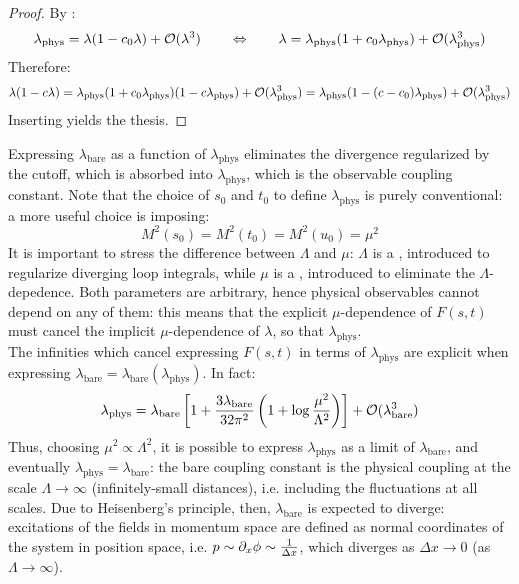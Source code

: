 \begin{proofbox}
  \begin{proof}
    By :
    \begin{equation*}
      \lambda_\text{phys} = \lambda (1 - c_0 \lambda) + \mathcal{O}(\lambda^3)
      \qquad \Leftrightarrow \qquad
      \lambda = \lambda_\text{phys} (1 + c_0 \lambda_\text{phys}) + \mathcal{O}(\lambda_\text{phys}^3)
    \end{equation*}
    Therefore:
    \begin{equation*}
      \lambda (1 - c \lambda) = \lambda_\text{phys} (1 + c_0 \lambda_\text{phys}) (1 - c \lambda_\text{phys}) + \mathcal{O}(\lambda_\text{phys}^3) = \lambda_\text{phys} (1 - (c - c_0) \lambda_\text{phys}) + \mathcal{O}(\lambda_\text{phys}^3)
    \end{equation*}
    Inserting  yields the thesis.
  \end{proof}
\end{proofbox}

Expressing $ \lambda_\text{bare} $ as a function of $ \lambda_\text{phys} $ eliminates the divergence regularized by the cutoff, which is absorbed into $ \lambda_\text{phys} $, which is the observable coupling constant. Note that the choice of $ s_0 $ and $ t_0 $ to define $ \lambda_\text{phys} $ is purely conventional: a more useful choice is imposing:
\begin{equation}
  M^2(s_0) = M^2(t_0) = M^2(u_0) = \mu^2
\end{equation}
It is important to stress the difference between $ \Lambda $ and $ \mu $: $ \Lambda $ is a , introduced to regularize diverging loop integrals, while $ \mu $ is a , introduced to eliminate the $ \Lambda $-depedence\footnotemark. Both parameters are arbitrary, hence physical observables cannot depend on any of them: this means that the explicit $ \mu $-dependence of $ F(s,t) $ must cancel the implicit $ \mu $-dependence of $ \lambda $, so that $ \lambda_\text{phys} $. \\
The infinities which cancel expressing $ F(s,t) $ in terms of $ \lambda_\text{phys} $ are explicit when expressing $ \lambda_\text{bare} = \lambda_\text{bare}(\lambda_\text{phys}) $. In fact:
\begin{equation*}
  \lambda_\text{phys} = \lambda_\text{bare} \left[ 1 + \frac{3\lambda_\text{bare}}{32\pi^2} \left( 1 + \log \frac{\mu^2}{\Lambda^2} \right) \right] + \mathcal{O}(\lambda_\text{bare}^3)
\end{equation*}
Thus, choosing $ \mu^2 \propto \Lambda^2 $, it is possible to express $ \lambda_\text{phys} $ as a limit of $ \lambda_\text{bare} $, and eventually $ \lambda_\text{phys} = \lambda_\text{bare} $: the bare coupling constant is the physical coupling at the scale $ \Lambda \rightarrow \infty $ (infinitely-small distances), i.e. including the fluctuations at all scales. Due to Heisenberg's principle, then, $ \lambda_\text{bare} $ is expected to diverge: excitations of the fields in momentum space are defined as normal coordinates of the system in position space, i.e. $ p \sim \partial_x \phi \sim \frac{1}{\Delta x} $, which diverges as $ \Delta x \rightarrow 0 $ (as $ \Lambda \rightarrow \infty $).

